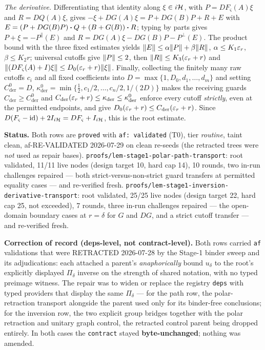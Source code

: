 \emph{The derivative.} Differentiating that identity along $\xi\in i\mathcal H$, with
$P=DF_{\varsigma}(A)\xi$ and $R=DQ(A)\xi$, gives $-\xi+DG(A)\xi=P+DG(B)P+R+E$ with
$E=(P+DG(B)P)\mathbin{\bm{\cdot}} Q+(B+G(B))\mathbin{\bm{\cdot}} R$; typing by parts gives $P+\xi=-P^{\parallel}(E)$ and
$R=DG(A)\xi-DG(B)P-P^{\perp}(E)$. The product bound with the three fixed estimates yields
$\lVert E\rVert\le\alpha\lVert P\rVert+\beta\lVert R\rVert$, $\alpha\le K_1\varepsilon_r$, $\beta\le K_2r$; universal
cutoffs give $\lVert P\rVert\le2$, then $\lVert R\rVert\le K_3(\varepsilon_r+r)$ and
$\lVert (DF_{\varsigma}(A)+I)\xi\rVert\le D_0(\varepsilon_r+r)\lVert \xi\rVert$. Finally, collecting the finitely
many raw cutoffs $c_i$ and all fixed coefficients into $D=\max\{1,D_0,d_1,\dots,d_m\}$ and
setting $C^{0}_{\mathrm{der}}=D$,
$\kappa^{0}_{\mathrm{der}}=\min\{\tfrac12,c_1/2,\dots,c_n/2,1/(2D)\}$ makes the receiving
guards $C_{\mathrm{der}}\ge C^{0}_{\mathrm{der}}$ and
$C_{\mathrm{der}}(\varepsilon_r+r)\le\kappa_{\mathrm{der}}\le\kappa^{0}_{\mathrm{der}}$ enforce
every cutoff \emph{strictly}, even at the permitted endpoints, and give
$D_0(\varepsilon_r+r)\le C_{\mathrm{der}}(\varepsilon_r+r)$. Since
$D(F_{\varsigma}-\mathrm{id})+2I_{i\mathcal H}=DF_{\varsigma}+I_{i\mathcal H}$, this is the root
estimate.

\medskip
\noindent\textbf{Status.} Both rows are \texttt{proved} with \texttt{af: validated} (T0),
tier \emph{routine}, taint clean, af-RE-VALIDATED 2026-07-29 on clean re-seeds (the
retracted trees were \emph{not} used as repair bases).
\texttt{proofs/lem-stage1-polar-path-transport}: root validated, 11/11 live nodes (design
target 10, hard cap 14), 10 rounds, two in-run challenges repaired --- both
strict-versus-non-strict guard transfers at permitted equality cases --- and re-verified
fresh. \texttt{proofs/lem-stage1-inversion-derivative-transport}: root validated, 25/25 live
nodes (design target 22, hard cap 25, not exceeded), 7 rounds, three in-run challenges
repaired --- the open-domain boundary cases at $r=\delta$ for $G$ and $DG$, and a strict
cutoff transfer --- and re-verified fresh.

\noindent\textbf{Correction of record (deps-level, not contract-level).} Both rows carried
\texttt{af} validations that were RETRACTED 2026-07-28 by the Stage-1 binder sweep and its
adjudications: each attached a parent's \emph{anaphorically} bound $u_\delta$ to the root's
explicitly displayed $\Pi_\delta$ inverse on the strength of shared notation, with no typed
preimage witness. The repair was to widen or replace the registry \texttt{deps} with typed
providers that display the same $\Pi_\delta$ --- for the path row, the polar-retraction
transport alongside the parent used only for its binder-free conclusions; for the inversion
row, the two explicit group bridges together with the polar retraction and unitary graph
control, the retracted control parent being dropped entirely. In both cases the
\texttt{contract} stayed \textbf{byte-unchanged}; nothing was amended.

